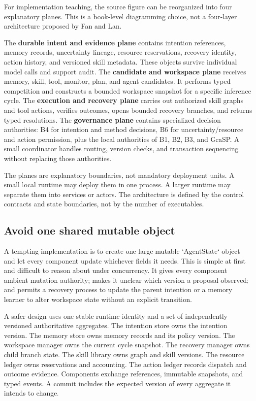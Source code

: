 For implementation teaching, the source figure can be reorganized into four explanatory planes. This is a book-level diagramming choice, not a four-layer architecture proposed by Fan and Lan.

The \textbf{durable intent and evidence plane} contains intention references, memory records, uncertainty lineage, resource reservations, recovery identity, action history, and versioned skill metadata. These objects survive individual model calls and support audit. The \textbf{candidate and workspace plane} receives memory, skill, tool, monitor, plan, and agent candidates. It performs typed competition and constructs a bounded workspace snapshot for a specific inference cycle. The \textbf{execution and recovery plane} carries out authorized skill graphs and tool actions, verifies outcomes, opens bounded recovery branches, and returns typed resolutions. The \textbf{governance plane} contains specialized decision authorities: B4 for intention and method decisions, B6 for uncertainty/resource and action permission, plus the local authorities of B1, B2, B3, and GraSP. A small coordinator handles routing, version checks, and transaction sequencing without replacing those authorities.

The planes are explanatory boundaries, not mandatory deployment units. A small local runtime may deploy them in one process. A larger runtime may separate them into services or actors. The architecture is defined by the control contracts and state boundaries, not by the number of executables.

\subsection{Avoid one shared mutable object}
\label{subsec:ch18-no-shared-mutable-object}

A tempting implementation is to create one large mutable `AgentState` object and let every component update whichever fields it needs. This is simple at first and difficult to reason about under concurrency. It gives every component ambient mutation authority; makes it unclear which version a proposal observed; and permits a recovery process to update the parent intention or a memory learner to alter workspace state without an explicit transition.

A safer design uses one stable runtime identity and a set of independently versioned authoritative aggregates. The intention store owns the intention version. The memory store owns memory records and its policy version. The workspace manager owns the current cycle snapshot. The recovery manager owns child branch state. The skill library owns graph and skill versions. The resource ledger owns reservations and accounting. The action ledger records dispatch and outcome evidence. Components exchange references, immutable snapshots, and typed events. A commit includes the expected version of every aggregate it intends to change.

